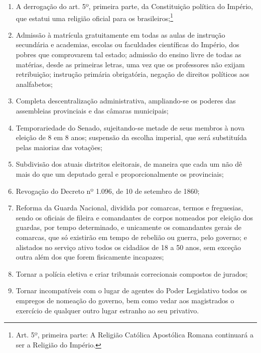 \begin{enumerate}[label=\arabic*º:]
\item A derrogação do art. 5º, primeira parte, da Constituição política do
Império, que estatui uma religião oficial para os
brasileiros;\footnote{Art. 5º, primeira parte: A Religião Católica
  Apostólica Romana continuará a ser a Religião do Império.}

\item Admissão à matrícula gratuitamente em todas as aulas de instrução
secundária e academias, escolas ou faculdades científicas do Império,
dos pobres que comprovarem tal estado; admissão do ensino livre de todas
as matérias, desde as primeiras letras, uma vez que os professores não
exijam retribuição; instrução primária obrigatória, negação de direitos
políticos aos analfabetos;

\item Completa descentralização administrativa, ampliando-se os poderes
das assembleias provinciais e das câmaras municipais;

\item Temporariedade do Senado, sujeitando-se metade de seus membros à
nova eleição de 8 em 8 anos; suspensão da escolha imperial, que será
substituída pelas maiorias das votações;

\item Subdivisão dos atuais distritos eleitorais, de maneira que cada um
não dê mais do que um deputado geral e proporcionalmente os provinciais;

\item Revogação do Decreto nº 1.096, de 10 de setembro de 1860;

\item Reforma da Guarda Nacional, dividida por comarcas, termos e
freguesias, sendo os oficiais de fileira e comandantes de corpos
nomeados por eleição dos guardas, por tempo determinado, e unicamente os
comandantes gerais de comarcas, que só existirão em tempo de rebelião ou
guerra, pelo governo; e alistados no serviço ativo todos os cidadãos de
18 a 50 anos, sem exceção outra além dos que forem fisicamente
incapazes;

\item Tornar a polícia eletiva e criar tribunais correcionais compostos de
jurados;

\item Tornar incompatíveis com o lugar de agentes do Poder Legislativo
todos os empregos de nomeação do governo, bem como vedar aos magistrados
o exercício de qualquer outro lugar estranho ao seu privativo.
\end{enumerate}

